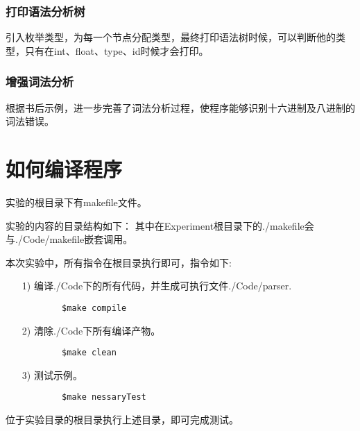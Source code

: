 \documentclass[UTF8]{ctexart}
\begin{document}
\subsubsection{打印语法分析树}
引入枚举类型，为每一个节点分配类型，最终打印语法树时候，可以判断他的类型，只有在int、float、type、id时候才会打印。
\subsubsection{增强词法分析}
根据书后示例，进一步完善了词法分析过程，使程序能够识别十六进制及八进制的词法错误。



\section{如何编译程序}



实验的根目录下有makefile文件。\par
实验的内容的目录结构如下：
其中在Experiment根目录下的./makefile会与./Code/makefile嵌套调用。\par
本次实验中，所有指令在根目录执行即可，指令如下:\par
\begin{itemize}
    \item [1)] 
    编译./Code下的所有代码，并生成可执行文件./Code/parser.
    \lstset{language=bash}
    \begin{lstlisting}
        $make compile
    \end{lstlisting} 
    \item [2)] 
    清除./Code下所有编译产物。
    \lstset{language=bash}
    \begin{lstlisting}
        $make clean
    \end{lstlisting} 
    \item [3)] 
    测试示例。
    \lstset{language=bash}
    \begin{lstlisting}
        $make nessaryTest
    \end{lstlisting} 
\end{itemize}
位于实验目录的根目录执行上述目录，即可完成测试。
\end{document}
